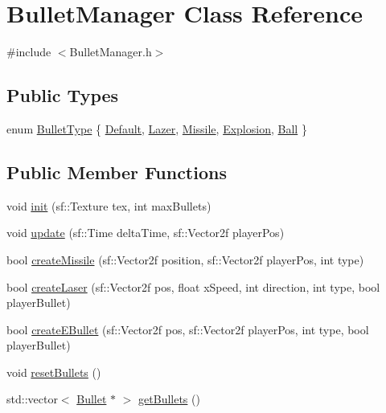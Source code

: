 \hypertarget{class_bullet_manager}{}\section{Bullet\+Manager Class Reference}
\label{class_bullet_manager}


{\ttfamily \#include $<$Bullet\+Manager.\+h$>$}

\subsection*{Public Types}
\begin{DoxyCompactItemize}
\item 
enum \hyperlink{class_bullet_manager_af49df9c4e5e7d87c13f2660851090580}{Bullet\+Type} \{ \newline
\hyperlink{class_bullet_manager_af49df9c4e5e7d87c13f2660851090580aa2bdb1bfdc8ecf1b600662b51102ea94}{Default}, 
\hyperlink{class_bullet_manager_af49df9c4e5e7d87c13f2660851090580ae7a50fdc1ce316dca314744566086fa0}{Lazer}, 
\hyperlink{class_bullet_manager_af49df9c4e5e7d87c13f2660851090580aa91f791a74307837d20bbfdd29e31916}{Missile}, 
\hyperlink{class_bullet_manager_af49df9c4e5e7d87c13f2660851090580a1e6c03478820ae36f239253d3b389268}{Explosion}, 
\newline
\hyperlink{class_bullet_manager_af49df9c4e5e7d87c13f2660851090580a17cc0a9c129f28a8fb22c46083f14df4}{Ball}
 \}
\end{DoxyCompactItemize}
\subsection*{Public Member Functions}
\begin{DoxyCompactItemize}
\item 
void \hyperlink{class_bullet_manager_ac2c9ad28a04c73e29be6737bf0e65b2a}{init} (sf\+::\+Texture tex, int max\+Bullets)
\item 
void \hyperlink{class_bullet_manager_ad4a0ca5d80bc781ccc9af56b710839ba}{update} (sf\+::\+Time delta\+Time, sf\+::\+Vector2f player\+Pos)
\item 
bool \hyperlink{class_bullet_manager_acd15785d7e030d0aecb61c46933d4432}{create\+Missile} (sf\+::\+Vector2f position, sf\+::\+Vector2f player\+Pos, int type)
\item 
bool \hyperlink{class_bullet_manager_a17d3960ef84f421c8937ed80acd39a8d}{create\+Laser} (sf\+::\+Vector2f pos, float x\+Speed, int direction, int type, bool player\+Bullet)
\item 
bool \hyperlink{class_bullet_manager_a12fa23a4873b2deaab339059756db0c0}{create\+E\+Bullet} (sf\+::\+Vector2f pos, sf\+::\+Vector2f player\+Pos, int type, bool player\+Bullet)
\item 
void \hyperlink{class_bullet_manager_ab1087897ac75b114d15f237fa98420a3}{reset\+Bullets} ()
\item 
std\+::vector$<$ \hyperlink{class_bullet}{Bullet} $\ast$ $>$ \hyperlink{class_bullet_manager_a6222ba71ad273259dbdaa8030abcbe80}{get\+Bullets} ()
\end{DoxyCompactItemize}
